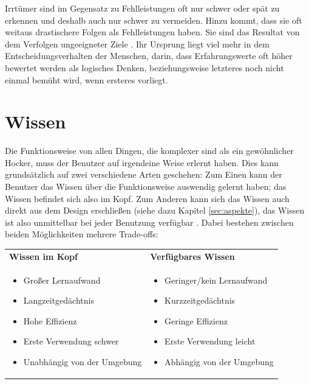 \documentclass[parskip,headsepline, headtopline, %
footsepline, oneside, 12pt, headings=small]{scrreprt}
\begin{document}
Irrtümer sind im Gegensatz zu Fehlleistungen oft nur schwer oder spät zu erkennen und deshalb auch nur schwer zu vermeiden. Hinzu kommt, dass sie oft weitaus drastischere Folgen als Fehlleistungen haben. Sie sind das Resultat von dem Verfolgen ungeeigneter Ziele \cite[S. 114]{don}. Ihr Ursprung liegt viel mehr in dem Entscheidungsverhalten der Menschen, darin, dass Erfahrungswerte oft höher bewertet werden als logisches Denken, beziehungsweise letzteres noch nicht einmal bemüht wird, wenn ersteres vorliegt.

\section{Wissen}

Die Funktionsweise von allen Dingen, die komplexer sind als ein gewöhnlicher Hocker, muss der Benutzer auf irgendeine Weise erlernt haben. Dies kann grundsätzlich auf zwei verschiedene Arten geschehen: Zum Einen kann der Benutzer das Wissen über die Funktionsweise auswendig gelernt haben; das Wissen befindet sich also im Kopf. Zum Anderen kann sich das Wissen auch direkt aus dem Design erschließen (siehe dazu Kapitel \ref{sec:aspekte}), das Wissen ist also unmittelbar bei jeder Benutzung verfügbar \cite[S.54ff]{don}. 
Dabei bestehen zwischen beiden Möglichkeiten mehrere Trade-offs:

\begin{tabular}{|p{}|p{}|}\hline\vspace{6pt}
\hspace{1cm}\textbf{Wissen im Kopf} & \vspace{6pt}\hspace{1cm}\textbf{Verfügbares Wissen}\\
\begin{itemize}
\item Großer Lernaufwand
\item Langzeitgedächtnis
\item Hohe Effizienz
\item Erste Verwendung schwer
\item Unabhängig von der Umgebung
\end{itemize} &
\begin{itemize}
\item Geringer/kein Lernaufwand
\item Kurzzeitgedächtnis
\item Geringe Effizienz
\item Erste Verwendung leicht
\item Abhängig von der Umgebung
\end{itemize}
\\\hline
\end{tabular}
\end{document}
